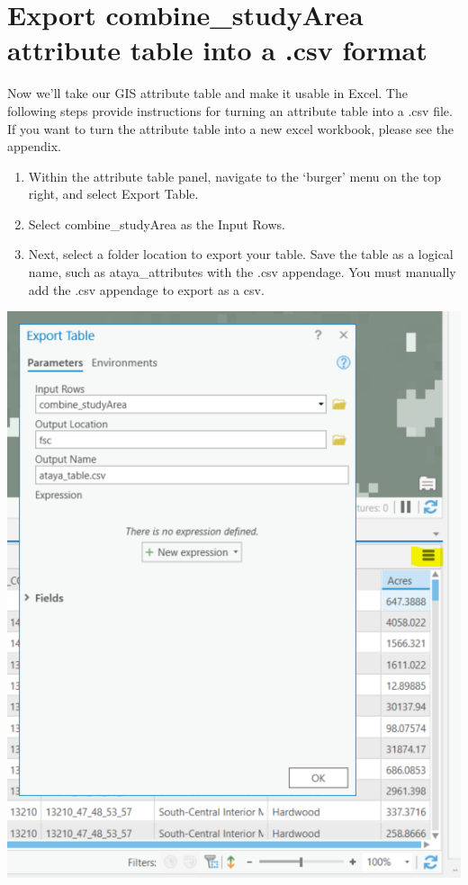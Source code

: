 \documentclass[
]{book}
\providecommand{\tightlist}{%
  \setlength{\itemsep}{0pt}\setlength{\parskip}{0pt}}
\begin{document}
\hypertarget{export-combine_studyarea-attribute-table-into-a-.csv-format}{%
\section{Export combine\_studyArea attribute table into a .csv format}\label{export-combine_studyarea-attribute-table-into-a-.csv-format}}

Now we'll take our GIS attribute table and make it usable in Excel. The following steps provide instructions for turning an attribute table into a .csv file. If you want to turn the attribute table into a new excel workbook, please see the appendix.

\begin{enumerate}
\def\labelenumi{\arabic{enumi}.}
\tightlist
\item
  Within the attribute table panel, navigate to the `burger' menu on the top right, and select Export Table.
\item
  Select combine\_studyArea as the Input Rows.
\item
  Next, select a folder location to export your table. Save the table as a logical name, such as ataya\_attributes with the .csv appendage. You must manually add the .csv appendage to export as a csv.
\end{enumerate}

\includegraphics[width=1000pt]{04_gis_screenshots/18_export_table}
\end{document}
